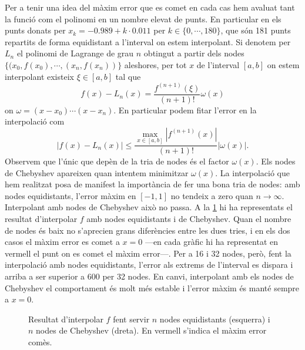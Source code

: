 \documentclass[12pt]{article}
\numberwithin{table}{section}
\numberwithin{figure}{section}
\numberwithin{equation}{section}
\newcommand{\abs}[1]{\left\lvert #1 \right\rvert}
\begin{document}
Per a tenir una idea del màxim error que es comet en cada cas hem avaluat tant la funció com el polinomi en un nombre elevat de punts. En particular en els punts donats per \( x_k = \num{-0.989} + k \cdot \num{0.011} \) per \( k \in \{0, \cdots, 180\} \), que són 181 punts repartits de forma equidistant a l'interval on estem interpolant. Si denotem per \( L_n \) el polinomi de Lagrange de grau \( n \) obtingut a partir dels nodes \( \{(x_0, f(x_0), \cdots , (x_n, f(x_n)) \} \) aleshores, per tot \( x \) de l'interval \( [a,b] \) on estem interpolant existeix \( \xi \in [a,b] \) tal que 
\begin{equation*}
	f(x) - L_n(x) = \frac{f^{(n+1)}(\xi)}{(n+1)!}\omega(x) 
\end{equation*}
on \( \omega = (x-x_0)\cdots(x-x_n) \). En particular podem fitar l'error en la interpolació com
\begin{equation*}
	\abs{f(x) - L_n(x)} \leqslant \frac{\max_{x \in [a,b]}\abs{f^{(n+1)}(x)}}{(n+1)!}\abs{\omega(x)}.
\end{equation*}
Observem que l'únic que depèn de la tria de nodes és el factor \( \omega(x) \). Els nodes de Chebyshev apareixen quan intentem minimitzar \( \omega(x) \). La interpolació que hem realitzat posa de manifest la importància de fer una bona tria de nodes: amb nodes equidistants, l'error màxim en \( [-1,1] \) no tendeix a zero quan \( n \to \infty \). Interpolant amb nodes de Chebyshev això no passa. A la \cref{fig:interpolacio} hi ha representats el resultat d'interpolar \( f \) amb nodes equidistants i de Chebyshev. Quan el nombre de nodes és baix no s'aprecien grans diferències entre les dues tries, i en els dos casos el màxim error es comet a \( x = 0 \) ---en cada gràfic hi ha representat en vermell el punt on es comet el màxim error---. Per a 16 i 32 nodes, però, fent la interpolació amb nodes equidistants, l'error als extrems de l'interval es dispara i arriba a ser superior a \( 600 \) per 32 nodes. En canvi, interpolant amb els nodes de Chebyshev el comportament és molt més estable i l'error màxim és manté sempre a \( x = 0 \). 

\begin{figure}[p]
	\centering
	\sffamily \footnotesize
	
	
	
	
	\caption{Resultat d'interpolar \( f \) fent servir \( n \) nodes equidistants (esquerra) i \( n \) nodes de Chebyshev (dreta). En vermell s'indica el màxim error comès.}
	\label{fig:interpolacio}
\end{figure}
\end{document}
